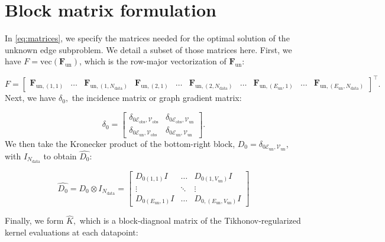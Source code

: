 \documentclass{article}
\theoremstyle{definition}
\theoremstyle{remark}
\begin{document}
\section{Block matrix formulation}\label{app:matrices}
In \eqref{eq:matrices}, we specify the matrices needed for the optimal solution of the unknown edge subproblem. We detail a subset of those matrices here. First, we have $F=\text{vec}(\mathbf{F}_\text{un})$, which is the row-major vectorization of $\mathbf{F}_\text{un}$:

\begin{equation}
    F = \begin{bmatrix}
        \mathbf{F}_{\text{un},(1,1)} &
        \hdots &
        \mathbf{F}_{\text{un},(1,N_\text{data})} &
        \mathbf{F}_{\text{un},(2,1)} &
        \hdots &
        \mathbf{F}_{\text{un},(2,N_\text{data})} &
        \hdots &
        \mathbf{F}_{\text{un},(E_\text{un},1)} &
        \hdots &
        \mathbf{F}_{\text{un},(E_\text{un},N_\text{data})} 
    \end{bmatrix}^\intercal.
\end{equation}
Next, we have $\delta_0,$ the incidence matrix or graph gradient matrix:

\begin{equation}
    \delta_0   =  \begin{bmatrix}
        \delta_{0 \mathcal{E}_\text{obs}, \mathcal{V}_\text{obs}} & \delta_{0 \mathcal{E}_\text{obs}, \mathcal{V}_\text{un}} \\
        \delta_{0 \mathcal{E}_\text{un}, \mathcal{V}_\text{obs}} & \delta_{0 \mathcal{E}_\text{un}, \mathcal{V}_\text{un}}
    \end{bmatrix}.
\end{equation}
We then take the Kronecker product of the bottom-right block, $D_0 = \delta_{0 \mathcal{E}_\text{un}, \mathcal{V}_\text{un}}$, with $I_{N_\text{data}}$ to obtain $\widehat{D_0}$:

\begin{equation}
    \widehat{D_0} = D_0 \otimes I_{N_\text{data}} = \begin{bmatrix}
        D_{0 (1,1)} I &  \hdots & D_{0 (1,V_{\text{un}})} I \\
        \vdots & \ddots & \vdots \\
        D_{0 (E_{\text{un}}, 1)} I & \hdots & D_{0, (E_{\text{un}}, V_{\text{un}})} I
    \end{bmatrix}     
\end{equation}

Finally, we form $\widehat{K},$ which is a block-diagnoal matrix of the Tikhonov-regularized kernel evaluations at each datapoint:
\end{document}
